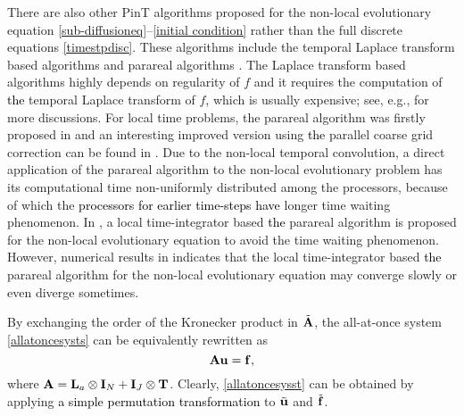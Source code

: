 \documentclass[11pt]{article}%
\numberwithin{equation}{section}
\begin{document}
There are also other PinT algorithms proposed for the non-local evolutionary equation \eqref{sub-diffusioneq}--\eqref{initial condition} rather than the full discrete equations \eqref{timestpdisc}. These algorithms include the temporal Laplace transform based algorithms \cite{kwon2003parallel,mclean2010maximum} and 
parareal algorithms \cite{xu2015parareal,wu2018parareal,li2013parallel,fu2019preconditioned}. The Laplace transform based algorithms highly depends on regularity of $f$ and it requires the computation of \textcolor{black}{the} temporal Laplace transform of $f$, which is usually expensive; see, e.g., \cite{gu2020109576,sheen2003parallel,sheen2000parallel,wu2017laplace} for more discussions. For local time problems, the parareal algorithm was firstly proposed in \cite{lions2001} and an interesting improved version using \textcolor{black}{the} parallel coarse grid correction can be found in \cite{wushulin2018}. Due to the non-local temporal convolution, a direct application of the parareal algorithm to the non-local evolutionary problem  has its computational time non-uniformly distributed among the processors, because of which the \textcolor{black}{processors for earlier time-steps have} longer time waiting phenomenon. In \cite{wu2018parareal}, a local time-integrator based \textcolor{black}{the} parareal algorithm is proposed for the non-local evolutionary equation to avoid the time waiting phenomenon. However, numerical results in \cite{wu2018solving} indicates that the local time-integrator based \textcolor{black}{the} parareal algorithm for the non-local evolutionary equation may converge slowly or even diverge sometimes.

By exchanging the order of the Kronecker product in $\tilde{\bf A}$, the all-at-once system \eqref{allatoncesysts} can be equivalently rewritten as
\begin{equation}\label{allatoncesysst}
{\bf A}{\bf u}={\bf f},
\end{equation}
where ${\bf A}={\bf L}_a\otimes{\bf I}_N+{\bf I}_J\otimes {\bf T}$. Clearly, \eqref{allatoncesysst} can be obtained by applying \textcolor{black}{a simple permutation transformation} to $\tilde{\bf u}$ and $\tilde{\bf f}$.
\end{document}
